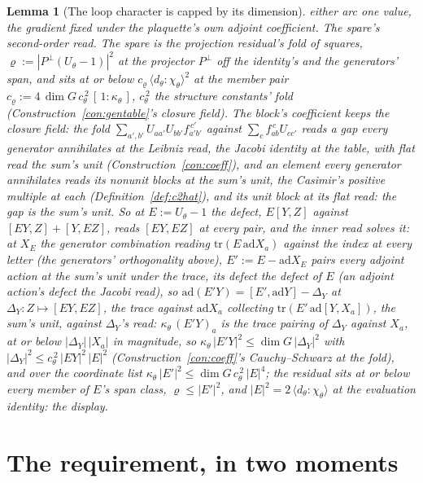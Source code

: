 \documentclass[11pt]{article}
\newtheorem{lemma}{Lemma}
\theoremstyle{definition}
\begin{document}
\begin{lemma}[The loop character is capped by its dimension]
either arc one value, the gradient fixed under the plaquette's own
adjoint coefficient. \emph{The spare's second-order read.} The
spare is the projection residual's fold of squares,
$\varrho:=|P^{\perp}(U_\theta-1)|^{2}$ at the projector $P^{\perp}$
off the identity's and the generators' span, and sits at or below
$c_\varrho\,\langle d_\theta\!:\!\chi_\theta\rangle^{2}$ at the
member pair $c_\varrho:=4\,\dim G\,c_\theta^{\,2}\,[\,1:\kappa_\theta\,]$,
$c_\theta^{\,2}$ the structure constants' fold
(Construction~\ref{con:gentable}'s closure field). The block's
coefficient keeps the closure field: the fold
$\sum_{a',b'}U_{aa'}U_{bb'}f_{a'b'}^{\,c'}$ against
$\sum_cf_{ab}^{\,c}U_{cc'}$ reads a gap every generator annihilates
at the Leibniz read, the Jacobi identity at the table, with flat
read the sum's unit (Construction~\ref{con:coeff}), and an element
every generator annihilates reads its nonunit blocks at the sum's
unit, the Casimir's positive multiple at each
(Definition~\ref{def:c2hat}), and its unit block at its flat read:
the gap is the sum's unit. So at $E:=U_\theta-1$ the \emph{defect},
$E[Y,Z]$ against $[EY,Z]+[Y,EZ]$, reads $[EY,EZ]$ at every pair,
and the \emph{inner read} solves it: at $X_E$ the generator
combination reading $\mathrm{tr}(E\,\mathrm{ad}X_a)$ against the
index at every letter (the generators' orthogonality above),
$E':=E-\mathrm{ad}X_E$ pairs every adjoint action at the sum's
unit under the trace, its defect the defect of $E$ (an adjoint
action's defect the Jacobi read), so
$\mathrm{ad}(E'Y)=[E',\mathrm{ad}Y]-\Delta_Y$ at
$\Delta_Y:Z\mapsto[EY,EZ]$, the trace against $\mathrm{ad}X_a$
collecting $\mathrm{tr}(E'\,\mathrm{ad}[Y,X_a])$, the sum's unit,
against $\Delta_Y$'s read: $\kappa_\theta\,(E'Y)_a$ is the trace
pairing of $\Delta_Y$ against $X_a$, at or below
$|\Delta_Y|\,|X_a|$ in magnitude, so
$\kappa_\theta\,|E'Y|^{2}\le\dim G\,|\Delta_Y|^{2}$ with
$|\Delta_Y|^{2}\le c_\theta^{\,2}\,|EY|^{2}\,|E|^{2}$
(Construction~\ref{con:coeff}'s Cauchy--Schwarz at the fold), and
over the coordinate list
$\kappa_\theta\,|E'|^{2}\le\dim G\,c_\theta^{\,2}\,|E|^{4}$; the
residual sits at or below every member of $E$'s span class,
$\varrho\le|E'|^{2}$, and $|E|^{2}=2\,\langle d_\theta\!:\!\chi_\theta\rangle$
at the evaluation identity: the display.
\end{lemma}

\section{The requirement, in two moments}
\end{document}
